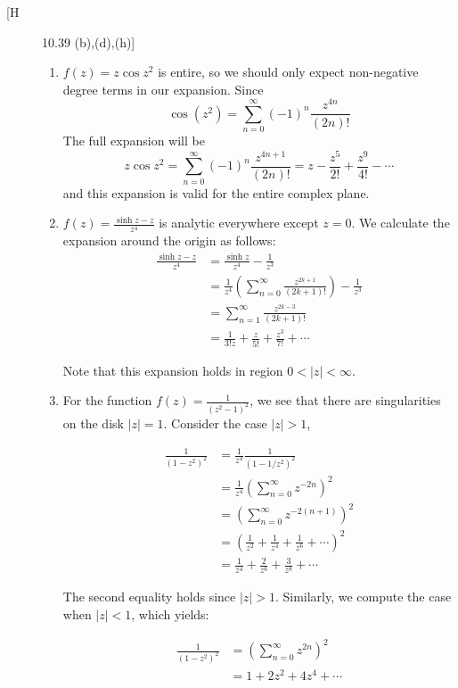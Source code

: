 \documentclass[12pt]{article}%
\begin{document}
\begin{description}
  \item[[H] 10.39 (b),(d),(h)]
  \begin{enumerate}
    \item $f(z) = z \cos{z^2}$ is entire, so we should only expect non-negative degree terms in our expansion. Since
    \[ \cos(z^2) = \sum_{n = 0}^\infty (-1)^n \frac{z^{4n}}{(2n)!} \] The full expansion will be
    \[ z \cos{z^2} = \sum_{n = 0}^\infty (-1)^n \frac{z^{4n+1}}{(2n)!} = z - \frac{z^5}{2!} + \frac{z^9}{4!} - \cdots \]
    and this expansion is valid for the entire complex plane.

    \item $f(z) = \frac{\sinh{z} - z}{z^4}$ is analytic everywhere except $z=0$. We calculate the expansion around the origin as follows:
    \begin{align*}
      \frac{\sinh{z} - z}{z^4} & = \frac{\sinh{z}}{z^4} - \frac{1}{z^3} \\
     & = \frac{1}{z^4}\left(\sum_{n = 0}^\infty \frac{z^{2k+1}}{(2k+1)!}\right) - \frac{1}{z^3} \\
     & = \sum_{n = 1}^\infty \frac{z^{2k-3}}{(2k+1)!} \\
     & = \frac{1}{3!z} + \frac{z}{5!} + \frac{z^3}{7!} + \cdots
    \end{align*}

    Note that this expansion holds in region $0 < |z| < \infty$.

    \item For the function $f(z) = \frac{1}{(z^2 -1)^2}$, we see that there are singularities on the disk $|z| = 1$. Consider the case $|z| > 1$,

    \begin{align*}
      \frac{1}{(1-z^2)^2} & = \frac{1}{z^4}\frac{1}{(1 - 1/z^2)^2} \\
      & = \frac{1}{z^4}\left(\sum_{n = 0}^\infty z^{-2n}\right)^2 \\
      & = \left(\sum_{n = 0}^\infty z^{-2(n+1)}  \right)^2 \\
      & = \left(\frac{1}{z^2} + \frac{1}{z^4} + \frac{1}{z^6} + \cdots  \right)^2 \\
      & = \frac{1}{z^4} + \frac{2}{z^6} + \frac{3}{z^8} + \cdots
    \end{align*}

    The second equality holds since $|z| > 1$. Similarly, we compute the case when $|z| < 1$, which yields:

    \begin{align*}
      \frac{1}{(1-z^2)^2} & = \left( \sum_{n = 0}^\infty z^{2n} \right)^2 \\
      & = 1 + 2z^2 + 4z^4 + \cdots
    \end{align*}
  \end{enumerate}


\end{description}
\end{document}
